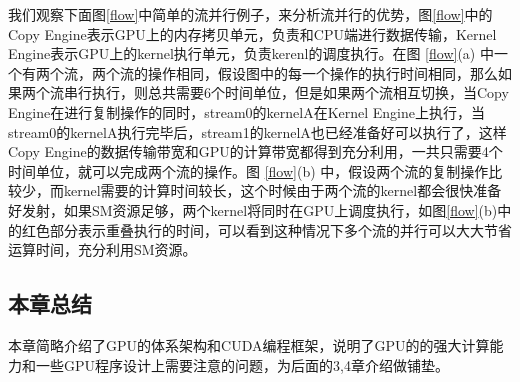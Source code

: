 我们观察下面图\ref{flow}中简单的流并行例子，来分析流并行的优势，图\ref{flow}中的Copy Engine表示GPU上的内存拷贝单元，负责和CPU端进行数据传输，Kernel Engine表示GPU上的kernel执行单元，负责kerenl的调度执行。在图 \ref{flow}(a) 中一个有两个流，两个流的操作相同，假设图中的每一个操作的执行时间相同，那么如果两个流串行执行，则总共需要6个时间单位，但是如果两个流相互切换，当Copy Engine在进行复制操作的同时，stream0的kernelA在Kernel Engine上执行，当stream0的kernelA执行完毕后，stream1的kernelA也已经准备好可以执行了，这样Copy Engine的数据传输带宽和GPU的计算带宽都得到充分利用，一共只需要4个时间单位，就可以完成两个流的操作。图 \ref{flow}(b) 中，假设两个流的复制操作比较少，而kernel需要的计算时间较长，这个时候由于两个流的kernel都会很快准备好发射，如果SM资源足够，两个kernel将同时在GPU上调度执行，如图\ref{flow}(b)中的红色部分表示重叠执行的时间，可以看到这种情况下多个流的并行可以大大节省运算时间，充分利用SM资源。

\subsection{本章总结}
本章简略介绍了GPU的体系架构和CUDA编程框架，说明了GPU的的强大计算能力和一些GPU程序设计上需要注意的问题，为后面的3,4章介绍做铺垫。
